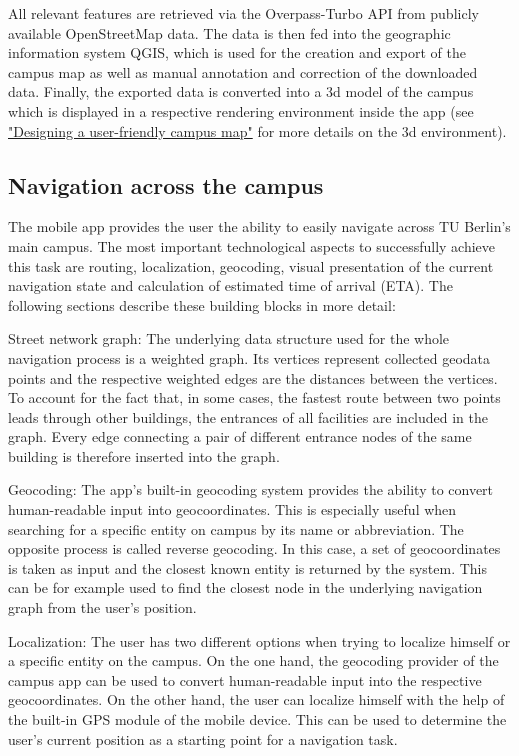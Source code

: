 All relevant features are retrieved via the Overpass-Turbo API from publicly available OpenStreetMap data. The data is then fed into the geographic information system QGIS, which is used for the creation and export of the campus map as well as manual annotation and correction of the downloaded data. Finally, the exported data is converted into a 3d model of the campus which is displayed in a respective rendering environment inside the app (see \hyperref[sub:campus_user_experience]{"Designing a user-friendly campus map"} for more details on the 3d environment).

\subsection{Navigation across the campus}
The mobile app provides the user the ability to easily navigate across TU Berlin's main campus. The most important technological aspects to successfully achieve this task are routing, localization, geocoding, visual presentation of the current navigation state and calculation of estimated time of arrival (ETA). The following sections describe these building blocks in more detail:

Street network graph: The underlying data structure used for the whole navigation process is a weighted graph. Its vertices represent collected geodata points and the respective weighted edges are the distances between the vertices. To account for the fact that, in some cases, the fastest route between two points leads through other buildings, the entrances of all facilities are included in the graph. Every edge connecting a pair of different entrance nodes of the same building is therefore inserted into the graph.

Geocoding: The app's built-in geocoding system provides the ability to convert human-readable input into geocoordinates. This is especially useful when searching for a specific entity on campus by its name or abbreviation. The opposite process is called reverse geocoding. In this case, a set of geocoordinates is taken as input and the closest known entity is returned by the system. This can be for example used to find the closest node in the underlying navigation graph from the user's position.

Localization: The user has two different options when trying to localize himself or a specific entity on the campus. On the one hand, the geocoding provider of the campus app can be used to convert human-readable input into the respective geocoordinates. On the other hand, the user can localize himself with the help of the built-in GPS module of the mobile device. This can be used to determine the user's current position as a starting point for a navigation task.

